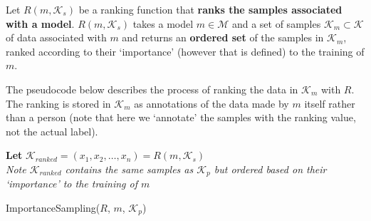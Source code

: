 \documentclass[../main.tex]{subfiles}
\begin{document}
    Let $R(m, \mathcal{K}_s)$ be a ranking function that \textbf{ranks the samples associated with a model}. $R(m, \mathcal{K}_s)$ takes a model $m\in\mathcal{M}$ and a set of samples $\mathcal{K}_m \subset \mathcal{K}$ of data associated with $m$ and returns an \textbf{ordered set}  of the samples in $\mathcal{K}_m$, ranked according to their `importance' (however that is defined) to the training of $m$. 

    The pseudocode below describes the process of ranking the data in $\mathcal{K}_m$ with $R$. The ranking is stored in $\mathcal{K}_m$ as annotations of the data made by $m$ itself rather than a person (note that here we `annotate' the samples with the ranking value, not the actual label).
    

    \vspace{0.2cm}
    \begin{algorithm}[H]
        \SetAlgoLined
        \textbf{Let} $\mathcal{K}_{ranked} = (x_1, x_2, \dots, x_n) = R(m, \mathcal{K}_s)$ \\
        \emph{Note $\mathcal{K}_{ranked}$ contains the same samples as $\mathcal{K}_p$ but ordered based on their `importance' to the training of $m$} \\
        \caption{ImportanceSampling($R$, $m$, $\mathcal{K}_p$)}
        \label{alg:sample_ranking}
    \end{algorithm}
\end{document}
